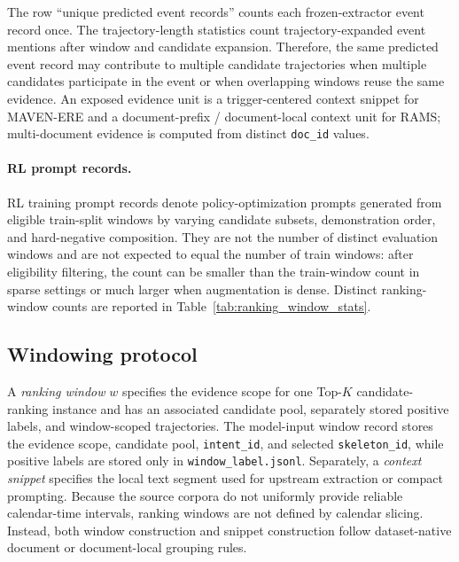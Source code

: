 \documentclass{article}
\begin{document}
The row ``unique predicted event records'' counts each frozen-extractor event record once.
The trajectory-length statistics count trajectory-expanded event mentions after window and candidate expansion.
Therefore, the same predicted event record may contribute to multiple candidate trajectories when multiple candidates participate in the event or when overlapping windows reuse the same evidence.
An exposed evidence unit is a trigger-centered context snippet for MAVEN-ERE and a document-prefix / document-local context unit for RAMS; multi-document evidence is computed from distinct \texttt{doc\_id} values.

\paragraph{RL prompt records.}
RL training prompt records denote policy-optimization prompts generated from eligible train-split windows by varying candidate subsets, demonstration order, and hard-negative composition.
They are not the number of distinct evaluation windows and are not expected to equal the number of train windows: after eligibility filtering, the count can be smaller than the train-window count in sparse settings or much larger when augmentation is dense.
Distinct ranking-window counts are reported in Table~\ref{tab:ranking_window_stats}.

\subsection{Windowing protocol}
\label{sec:app_data_windowing}

A \emph{ranking window} $w$ specifies the evidence scope for one Top-$K$ candidate-ranking instance and has an associated candidate pool, separately stored positive labels, and window-scoped trajectories.
The model-input window record stores the evidence scope, candidate pool, \texttt{intent\_id}, and selected \texttt{skeleton\_id}, while positive labels are stored only in \texttt{window\_label.jsonl}.
Separately, a \emph{context snippet} specifies the local text segment used for upstream extraction or compact prompting.
Because the source corpora do not uniformly provide reliable calendar-time intervals, ranking windows are not defined by calendar slicing.
Instead, both window construction and snippet construction follow dataset-native document or document-local grouping rules.
\end{document}
